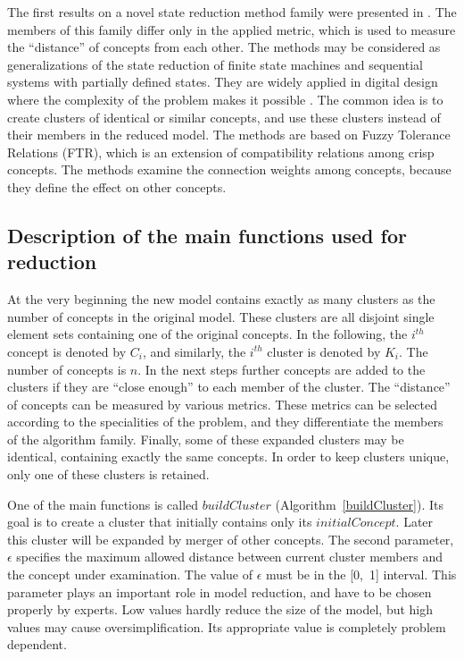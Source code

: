 \documentclass[graybox]{svmult}
\begin{document}
The first results on a novel state reduction method family were presented in \cite{hatwagner2014strategic,hatwagner2015new}. The members of this family differ only in the applied metric, which is used to measure the ``distance'' of concepts from each other. The methods may be considered as generalizations of the state reduction of finite state machines and sequential systems with partially defined states. They are widely applied in digital design where the complexity of the problem makes it possible \cite{kohaviz.jhan.k.2009}. The common idea is to create clusters of identical or similar concepts, and use these clusters instead of their members in the reduced model. The methods are based on Fuzzy Tolerance Relations (FTR), which is an extension of compatibility relations among crisp concepts. The methods examine the connection weights among concepts, because they define the effect on other concepts.

\subsection{Description of the main functions used for reduction}
\label{sec:reductionFunctions}

At the very beginning the new model contains exactly as many clusters as the number of concepts in the original model. These clusters are all disjoint single element sets containing one of the original concepts. In the following, the $i^{th}$ concept is denoted by $C_i$, and similarly, the $i^{th}$ cluster is denoted by $K_i$. The number of concepts is $n$. In the next steps further concepts are added to the clusters if they are ``close enough'' to each member of the cluster. The ``distance'' of concepts can be measured by various metrics. These metrics can be selected according to the specialities of the problem, and they differentiate the members of the algorithm family. Finally, some of these expanded clusters may be identical, containing exactly the same concepts. In order to keep clusters unique, only one of these clusters is retained.

One of the main functions is called $buildCluster$ (Algorithm~\ref{buildCluster}). Its goal is to create a cluster that initially contains only its $initialConcept$. Later this cluster will be expanded by merger of other concepts. The second parameter, $\epsilon$ specifies the maximum allowed distance between current cluster members and the concept under examination. The value of $\epsilon$ must be in the [0,~1] interval. This parameter plays an important role in model reduction, and have to be chosen properly by experts. Low values hardly reduce the size of the model, but high values may cause oversimplification. Its appropriate value is completely problem dependent.
\end{document}
